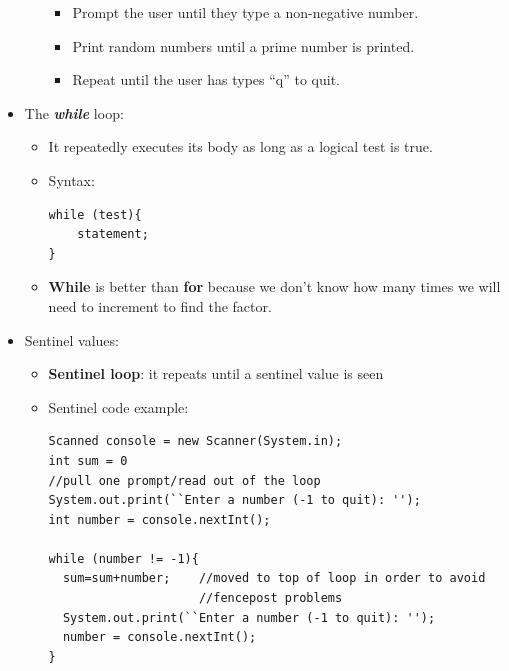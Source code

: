 \documentclass[a4paper]{article}
\begin{document}
\begin{itemize}
\begin{itemize}
      \begin{itemize}
        \item Prompt the user until they type a non-negative number.
        \item Print random numbers until a prime number is printed.
        \item Repeat until the user has types ``q'' to quit.
      \end{itemize}  
  \end{itemize}
\item The \textit{\textbf{while}} loop:
  \begin{itemize}
    \item It repeatedly executes its body as long as a logical test is true.
    \item Syntax:
    \begin{lstlisting}
while (test){
    statement;
}
    \end{lstlisting}
    \item \textbf{While} is better than \textbf{for} because we don't know how many times we will need to increment to find the factor.
  \end{itemize}
\item Sentinel values:
  \begin{itemize}
    \item \textbf{Sentinel loop}: it repeats until a sentinel value is seen
    \item Sentinel code example:
    \begin{lstlisting}
Scanned console = new Scanner(System.in);
int sum = 0
//pull one prompt/read out of the loop
System.out.print(``Enter a number (-1 to quit): '');
int number = console.nextInt();

while (number != -1){
  sum=sum+number;    //moved to top of loop in order to avoid
                     //fencepost problems
  System.out.print(``Enter a number (-1 to quit): '');
  number = console.nextInt();
}


\end{lstlisting}
\end{itemize}
\end{itemize}
\end{document}
